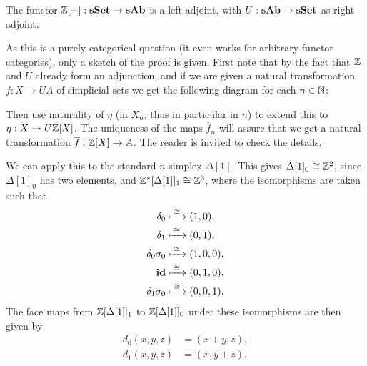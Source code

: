 \begin{lemma}
	The functor $\mathbb{Z}[-]: \mathbf{sSet} \to \mathbf{sAb}$ is a left adjoint, with $U: \mathbf{sAb} \to \mathbf{sSet}$ as right adjoint.
\end{lemma}
As this is a purely categorical question (it even works for arbitrary functor categories), only a sketch of the proof is given. First note that by the fact that $\mathbb{Z}$ and $U$ already form an adjunction, and if we are given a natural transformation $f: X \to UA$ of simplicial sets we get the following diagram for each $n \in \mathbb{N}$:
\begin{center}
\end{center}
Then use naturality of $\eta$ (in $X_n$, thus in particular in $n$) to extend this to $\eta : X \to U\mathbb{Z}[X]$. The uniqueness of the maps $\overline{f}_n$ will assure that we get a natural transformation $\overline{f}: \mathbb{Z}[X] \to A$. The reader is invited to check the details.


\begin{example}
	We can apply this to the standard $n$-simplex $\Delta[1]$. This gives $\Delta[1]_0 \cong \mathbb{Z}^2$, since $\Delta[1]_0$ has two elements, and $\mathbb{Z}^\ast[\Delta[1]]_1 \cong \mathbb{Z}^3$, where the isomorphisms are taken such that
	\begin{align*}
		\delta_0         &\xmapsto{\,\,{\cong}\,\,} (1, 0), \\
		\delta_1         &\xmapsto{\,\,{\cong}\,\,} (0, 1), \\
		\delta_0\sigma_0 &\xmapsto{\,\,{\cong}\,\,} (1, 0, 0), \\
		\mathbf{id}              &\xmapsto{\,\,{\cong}\,\,} (0, 1, 0), \\
		\delta_1\sigma_0 &\xmapsto{\,\,{\cong}\,\,} (0, 0, 1).
	\end{align*}
	The face maps from $\mathbb{Z}[\Delta[1]]_1$ to $\mathbb{Z}[\Delta[1]]_0$ under these isomorphisms are then given by
	\begin{align*}
		d_0(x, y, z) &= (x+y, z), \\
		d_1(x, y, z) &= (x, y+z).
	\end{align*}
\end{example}

